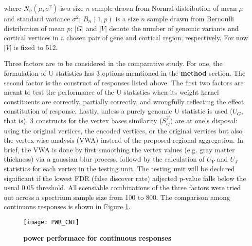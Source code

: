 where $N_n(\mu, \sigma^2)$ is a size $n$ sample drawn from Normal distribution of mean $\mu$ and standard variance $\sigma^2$; $B_n(1, p)$ is a size $n$ sample drawn from Bernoulli distribution of mean $p$; $|G|$ and $|V|$ denote the number of genomic variants and cortical vertices in a chosen pair of gene and cortical region, respectively. For now $|V|$ is fixed to 512.

Three factors are to be considered in the comparative study. For one, the formulation of U statistics has 3 options memtioned in the \textbf{method} section. The second factor is the construct of responses listed above. The first two factors are meant to test the performance of the U statistics when its weight kernel constituents are correctly, partially correctly, and wrongfully reflecting the effect constitution of response. Lastly, unless a purely genomic U statistic is used ($U_G$, that is), 3 constructs for the vertex bases similarity ($S_{ij}^V$) are at one's disposal: using the original vertices, the encoded vertices, or the original vertices but also the vertex-wise analysis (VWA) instead of the proposed regional aggregation. In brief, the VWA is done by first smoothing the vertex values (e.g. gray matter thickness) via a gaussian blur process, followd by the calculation of $U_V$ and $U_J$ statistics for each vertex in the testing unit. The testing unit will be declared significant if the lowest FDR (false discover rate) adjected p-value falls below the usual 0.05 threshold. All scensiable combinations of the three factors were tried out across a spectrium sample size from 100 to 800. The comparison among continuous responses is shown in Figure \ref{fig:PWR_CNT}.

\begin{figure}[h]
\centering
\texttt{[image: PWR\_CNT]}
\caption{\textbf{power performace for continuous responses}}
\label{fig:PWR_CNT}
\end{figure}


